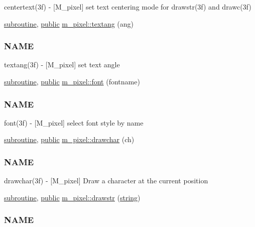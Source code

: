 \begin{DoxyCompactItemize}
\begin{DoxyCompactList}
centertext(3f) -\/ \mbox{[}M\+\_\+pixel\mbox{]} set text centering mode for drawstr(3f) and drawc(3f) \end{DoxyCompactList}\item 
\hyperlink{M__stopwatch_83_8txt_acfbcff50169d691ff02d4a123ed70482}{subroutine}, \hyperlink{M__stopwatch_83_8txt_a2f74811300c361e53b430611a7d1769f}{public} \hyperlink{namespacem__pixel_a5e213461e9894b99c9e8f278d5c4a858}{m\+\_\+pixel\+::textang} (ang)
\begin{DoxyCompactList}\small\item\em \subsubsection*{N\+A\+ME}

textang(3f) -\/ \mbox{[}M\+\_\+pixel\mbox{]} set text angle \end{DoxyCompactList}\item 
\hyperlink{M__stopwatch_83_8txt_acfbcff50169d691ff02d4a123ed70482}{subroutine}, \hyperlink{M__stopwatch_83_8txt_a2f74811300c361e53b430611a7d1769f}{public} \hyperlink{namespacem__pixel_a566adb827a3a26ba42d4e86e4c6e12af}{m\+\_\+pixel\+::font} (fontname)
\begin{DoxyCompactList}\small\item\em \subsubsection*{N\+A\+ME}

font(3f) -\/ \mbox{[}M\+\_\+pixel\mbox{]} select font style by name \end{DoxyCompactList}\item 
\hyperlink{M__stopwatch_83_8txt_acfbcff50169d691ff02d4a123ed70482}{subroutine}, \hyperlink{M__stopwatch_83_8txt_a2f74811300c361e53b430611a7d1769f}{public} \hyperlink{namespacem__pixel_a58406ffd6c2a9fdf2ea7772198b54255}{m\+\_\+pixel\+::drawchar} (ch)
\begin{DoxyCompactList}\small\item\em \subsubsection*{N\+A\+ME}

drawchar(3f) -\/ \mbox{[}M\+\_\+pixel\mbox{]} Draw a character at the current position \end{DoxyCompactList}\item 
\hyperlink{M__stopwatch_83_8txt_acfbcff50169d691ff02d4a123ed70482}{subroutine}, \hyperlink{M__stopwatch_83_8txt_a2f74811300c361e53b430611a7d1769f}{public} \hyperlink{namespacem__pixel_a6fa0c2d531d1ac74840aa2f0e2b050e0}{m\+\_\+pixel\+::drawstr} (\hyperlink{what__overview_81_8txt_a74cb7e955273b9f9157b4f0c18a38849}{string})
\begin{DoxyCompactList}\small\item\em \subsubsection*{N\+A\+ME}


\end{DoxyCompactList}
\end{DoxyCompactItemize}
